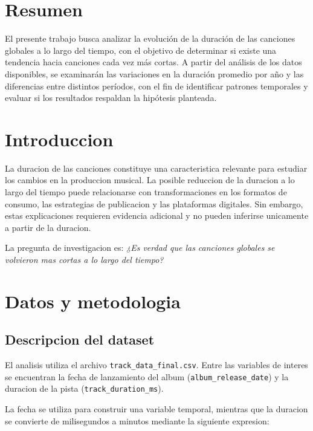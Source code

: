 \documentclass[11pt,a4paper]{article}
\begin{document}

\section{Resumen}

El presente trabajo busca analizar la evolución de la duración de las canciones globales a lo largo del tiempo, con el objetivo de determinar si existe una tendencia hacia canciones cada vez más cortas. A partir del análisis de los datos disponibles, se examinarán las variaciones en la duración promedio por año y las diferencias entre distintos períodos, con el fin de identificar patrones temporales y evaluar si los resultados respaldan la hipótesis planteada.

\section{Introduccion}

La duracion de las canciones constituye una caracteristica
relevante para estudiar los cambios en la produccion musical.
La posible reduccion de la duracion a lo largo del tiempo
puede relacionarse con transformaciones en los formatos de
consumo, las estrategias de publicacion y las plataformas
digitales. Sin embargo, estas explicaciones requieren
evidencia adicional y no pueden inferirse unicamente a
partir de la duracion.



La pregunta de investigacion es:
\textit{¿Es verdad que las canciones globales se volvieron
mas cortas a lo largo del tiempo?}



\section{Datos y metodologia}

\subsection{Descripcion del dataset}

El analisis utiliza el archivo
\texttt{track\_data\_final.csv}. Entre las variables de
interes se encuentran la fecha de lanzamiento del album
(\texttt{album\_release\_date}) y la duracion de la pista
(\texttt{track\_duration\_ms}).

La fecha se utiliza para construir una variable temporal,
mientras que la duracion se convierte de milisegundos
a minutos mediante la siguiente expresion:
\end{document}
